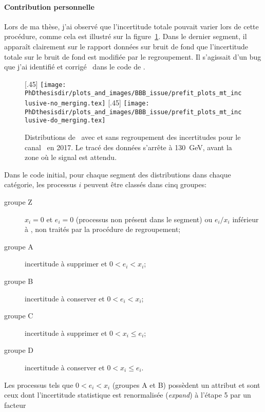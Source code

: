 \paragraph{Contribution personnelle}
Lors de ma thèse, j'ai observé que l'incertitude totale pouvait varier lors de cette procédure, comme cela est illustré sur la figure~\ref{fig-BBB_issue_2017_mt}.
Dans le dernier segment, il apparaît clairement sur le rapport données sur bruit de fond que l'incertitude totale sur le bruit de fond est modifiée par le regroupement.
Il s'agissait d'un bug que j'ai identifié et corrigé~\cite{BBB_PR} dans le code de \COMBINE.
\begin{figure}[h]
\centering

[.45\textwidth]
{\LARGE\texttt{[image: \\PhDthesisdir/plots\_and\_images/BBB\_issue/prefit\_plots\_mt\_inclusive-no\_merging.tex]}}
\hfill
{}[.45\textwidth]
{\LARGE\texttt{[image: \\PhDthesisdir/plots\_and\_images/BBB\_issue/prefit\_plots\_mt\_inclusive-do\_merging.tex]}}

\caption[Distributions de \mTtot\ avec et sans regroupement des incertitudes.]{Distributions de \mTtot\ avec et sans regroupement des incertitudes pour le canal \mu\tauh\ en 2017. Le tracé des données s'arrête à \SI{130}{\GeV}, avant la zone où le signal est attendu.}
\label{fig-BBB_issue_2017_mt}
\end{figure}
\par
Dans le code initial,
pour chaque segment des distributions dans chaque catégorie,
les processus $i$ peuvent être classés dans cinq groupes:
\begin{description}
\item[groupe Z] $x_i = 0$ et $e_i = 0$ (processus non présent dans le segment) ou $e_i/x_i$ inférieur à , non traités par la procédure de regroupement;
\item[groupe A] incertitude à supprimer et $0 < e_i < x_i$;
\item[groupe B] incertitude à conserver et $0 < e_i < x_i$;
\item[groupe C] incertitude à supprimer et $0 < x_i \leq e_i$;
\item[groupe D] incertitude à conserver et $0 < x_i \leq e_i$.
\end{description}
Les processus tels que $0 < e_i < x_i$ (groupes A et B)
possèdent un attribut 
et sont ceux dont l'incertitude statistique est renormalisée (\emph{expand}) à l'étape 5 par un facteur
